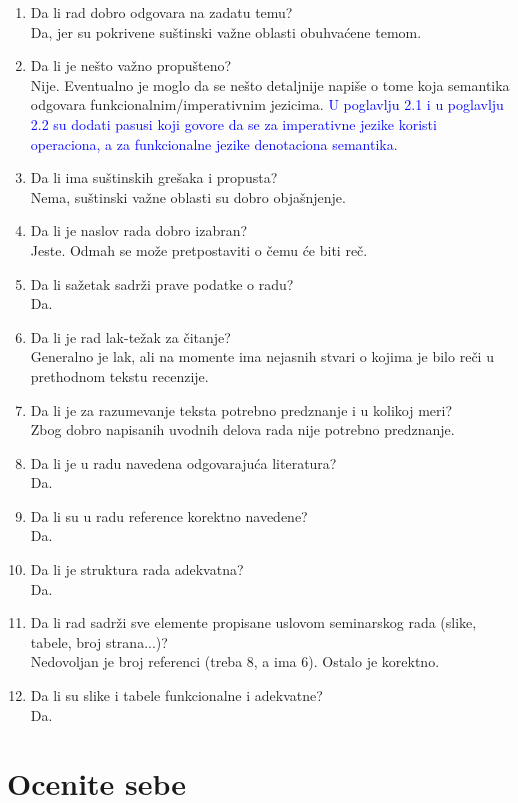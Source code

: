 \documentclass[a4paper]{report}
\newcommand{\odgovor}[1]{\textcolor{blue}{#1}}
\begin{document}
\begin{enumerate}
\item Da li rad dobro odgovara na zadatu temu?\\
{Da, jer su pokrivene suštinski važne oblasti obuhvaćene temom.}
\item Da li je nešto važno propušteno?\\
{Nije. Eventualno je moglo da se nešto detaljnije napiše o tome koja semantika odgovara funkcionalnim/imperativnim jezicima.}
\odgovor{U poglavlju 2.1 i u poglavlju 2.2 su dodati pasusi koji govore da se za imperativne jezike koristi operaciona, a za funkcionalne jezike denotaciona semantika.}
\item Da li ima suštinskih grešaka i propusta?\\
{Nema, suštinski važne oblasti su dobro objašnjenje.}
\item Da li je naslov rada dobro izabran?\\
{Jeste. Odmah se može pretpostaviti o čemu će biti reč.}
\item Da li sažetak sadrži prave podatke o radu?\\
{Da.}
\item Da li je rad lak-težak za čitanje?\\
{Generalno je lak, ali na momente ima nejasnih stvari o kojima je bilo reči u prethodnom tekstu recenzije.}
\item Da li je za razumevanje teksta potrebno predznanje i u kolikoj meri?\\
{Zbog dobro napisanih uvodnih delova rada nije potrebno predznanje.}
\item Da li je u radu navedena odgovarajuća literatura?\\
{Da.}
\item Da li su u radu reference korektno navedene?\\
{Da.}
\item Da li je struktura rada adekvatna?\\
{Da.}
\item Da li rad sadrži sve elemente propisane uslovom seminarskog rada (slike, tabele, broj strana...)?\\
{Nedovoljan je broj referenci (treba 8, a ima 6). Ostalo je korektno.}
\item Da li su slike i tabele funkcionalne i adekvatne?\\
{Da.}
\end{enumerate}

\section{Ocenite sebe}
\end{document}
